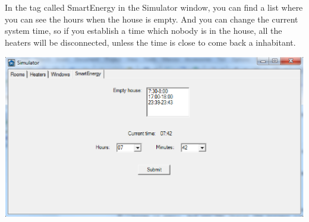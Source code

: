 In the tag called SmartEnergy in the Simulator window, you can find a list where you can see the hours when the house is empty. And you can change the current system time, so if you establish a time which nobody is in the house, all the heaters will be disconnected, unless the time is close to come back a inhabitant.
\begin{center}
	\includegraphics[width=.99\linewidth]{images/simulatorSmartEnergy.eps}
	\\
\vspace{1cm}
\end{center}
